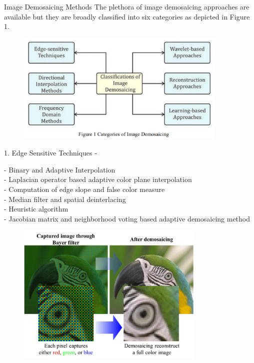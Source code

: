 \documentclass[final]{beamer}
\newlength{\colwidth}
\begin{document}
\begin{frame}[t]
\begin{columns}[t]
\begin{column}{\colwidth}
\begin{block}{Image Demosaicing Methods}
The plethora of image demosaicing approaches are available but they are broadly classified into six categories as
depicted in Figure 1.
\begin{figure}
    \centering
    \includegraphics[width=0.9\textwidth]{logos/Screenshot (160).png}
    \label{fig:img1}
\end{figure}
    \par 1. Edge Sensitive Techniques - 
\par - Binary and Adaptive Interpolation \\ - Laplacian operator based adaptive color plane interpolation \\ - Computation of edge slope and false color measure \\ - Median filter and spatial deinterlacing \\ - Heuristic algorithm \\ - Jacobian matrix and neighborhood voting based adaptive demosaicing method 

\begin{figure}
    \includegraphics[width=0.8\textwidth]{logos/An-example-of-the-demosaicing-process.png}
    \end{figure}
    

\end{block}
\end{column}
\end{columns}
\end{frame}
\end{document}

